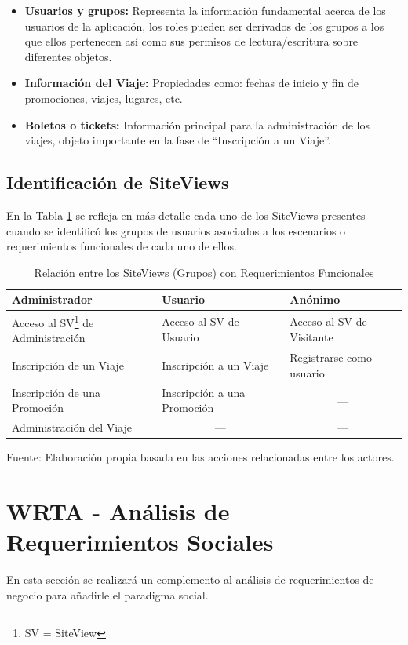 \documentclass[oneside,12pt,a4paper]{memoir}%
\begin{document}
		\begin{itemize}
		  \item \textbf{Usuarios y grupos:} Representa la informaci\'on
		  fundamental acerca de los usuarios de la aplicaci\'on, los roles
		  pueden ser derivados de los grupos a los que ellos pertenecen as\'i
		  como sus permisos de lectura/escritura sobre diferentes objetos.
		  \item \textbf{Informaci\'on del Viaje:} Propiedades como: fechas de inicio y
		  fin de promociones, viajes, lugares, etc.
		  \item \textbf{Boletos o tickets:} Informaci\'on principal para la
		  administraci\'on de los viajes, objeto importante en la fase de
		  ``Inscripci\'on a un Viaje''.
		\end{itemize}
		
		\subsection{Identificaci\'on de SiteViews}
		\label{ssec:siteViews}
		En la Tabla \ref{tab:associationUG_SV} se refleja en m\'as detalle cada uno de
		los SiteViews presentes cuando se identific\'o los grupos de usuarios
		asociados a los escenarios o requerimientos funcionales de cada uno de ellos.
		
		\begin{table}[htbp]
		\centering
		\caption{Relaci\'on entre los SiteViews (Grupos) con Requerimientos
		Funcionales}
			\begin{tabular}{|l|l|l|}
			\hline
			Administrador	& Usuario	& An\'onimo\\ \hline
			Acceso al SV\footnote{SV = SiteView} de Administraci\'on & Acceso al SV de
			Usuario & Acceso al SV de Visitante \\\hline
			Inscripci\'on de un Viaje &
			Inscripci\'on a un Viaje & Registrarse como usuario \\\hline
			Inscripci\'on de una Promoci\'on & Inscripci\'on a una Promoci\'on &
			\multicolumn{1}{c|}{---}\\
			\hline Administraci\'on del Viaje & \multicolumn{1}{c|}{---} & \multicolumn{1}{c|}{---}
			\\
			\hline
			\end{tabular}
		\newline
		Fuente: Elaboraci\'on propia basada en las acciones relacionadas entre los
		actores.
		\label{tab:associationUG_SV}
		\end{table}
		
	\section{WRTA - An\'alisis de Requerimientos Sociales}
	\label{sec:socReqAnalysis}
	En esta secci\'on se realizar\'a un complemento al an\'alisis de
	requerimientos de negocio para a\~nadirle el paradigma social.
	
\end{document}
